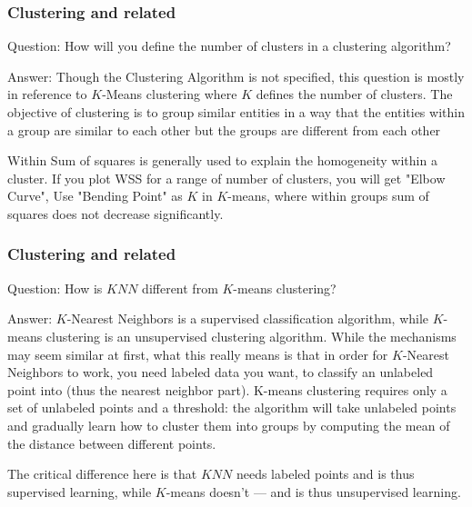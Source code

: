 \documentclass[11pt]{beamer}
\begin{document}
\begin{frame}
\frametitle{Clustering and related}
\begin{block}{Question:}
	How will you define the number of clusters in a clustering algorithm?
\end{block}
\begin{block}{Answer:}
	Though the Clustering Algorithm is not specified, this question is mostly in reference to $K$-Means clustering where $K$ defines the number of clusters. The objective of clustering is to group similar entities in a way that the entities within a group are similar to each other but the groups are different from each other
	
	Within Sum of squares is generally used to explain the homogeneity within a cluster. If you plot WSS for a range of number of clusters, you will get "Elbow Curve", Use "Bending Point" as $K$ in $K$-means, where within groups sum of squares does not decrease significantly.
\end{block}
\end{frame}

\begin{frame}
\frametitle{Clustering and related}
\begin{block}{Question:}
	How is $KNN$ different from $K$-means clustering?
\end{block}
\begin{block}{Answer:}
	$K$-Nearest Neighbors is a supervised classification algorithm, while $K$-means clustering is an unsupervised clustering algorithm. While the mechanisms may seem similar at first, what this really means is that in order for $K$-Nearest Neighbors to work, you need labeled data you want, to classify an unlabeled point into (thus the nearest neighbor part). K-means clustering requires only a set of unlabeled points and a threshold: the algorithm will take unlabeled points and gradually learn how to cluster them into groups by computing the mean of the distance between different points.
	
	The critical difference here is that $KNN$ needs labeled points and is thus supervised learning, while $K$-means doesn’t — and is thus unsupervised learning.
\end{block}
\end{frame}
\end{document}
